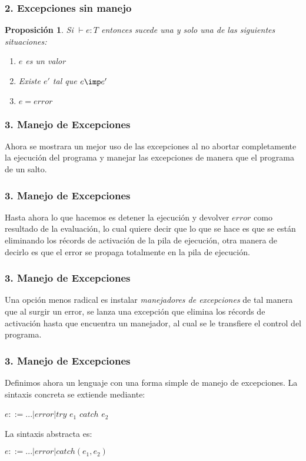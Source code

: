 \documentclass[xcolor=dvipsnames,table,spanish]{beamer}
\newtheorem{prop}{Proposición}
\begin{document}
\begin{frame}
\frametitle{2. Excepciones sin manejo}
\begin{prop}
Si $\vdash e:T$ entonces sucede una y solo una de las siguientes situaciones:
\begin{enumerate}
\item $e$ es un valor
\item Existe $e'$ tal que $e \imp e'$
\item $e = error$
\end{enumerate}
\end{prop}
\end{frame}

\begin{frame}
\frametitle{3. Manejo de Excepciones}
Ahora se mostrara un mejor uso de las excepciones al no abortar completamente la ejecución del programa y manejar las excepciones de manera que el programa de un salto.

\end{frame}

\begin{frame}
\frametitle{3. Manejo de Excepciones}
Hasta ahora lo que hacemos es detener la ejecución y devolver $error$ como resultado de la evaluación, lo cual quiere decir que lo que se hace es que se están eliminando los récords de activación de la pila de ejecución, otra manera de decirlo es que el error se propaga totalmente en la pila de ejecución.
\end{frame}

\begin{frame}
\frametitle{3. Manejo de Excepciones}
Una opción menos radical es instalar \textit{manejadores de excepciones} de tal manera que al surgir un error, se lanza una excepción que elimina los récords de activación hasta que encuentra un manejador, al cual se le transfiere el control del programa.
\end{frame}

\begin{frame}
\frametitle{3. Manejo de Excepciones}
Definimos ahora un lenguaje con una forma simple de manejo de excepciones.\newline
La sintaxis concreta se extiende mediante:
\begin{center}
      $e::=...|error|try$ $e_1$ $catch$ $e_2$
\end{center}
La sintaxis abstracta es:
\begin{center}
      $e::=...|error|catch(e_1,e_2)$
\end{center}
\end{frame}
\end{document}
